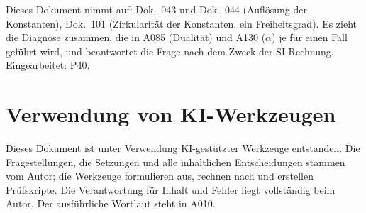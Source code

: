 Dieses Dokument nimmt auf: Dok.~043 und Dok.~044 (Auflösung der Konstanten),
Dok.~101 (Zirkularität der Konstanten, ein Freiheitsgrad). Es zieht die
Diagnose zusammen, die in A085 (Dualität) und A130 ($\alpha$) je für einen Fall
geführt wird, und beantwortet die Frage nach dem Zweck der SI-Rechnung.
Eingearbeitet: P40.

\section{Verwendung von KI-Werkzeugen}

Dieses Dokument ist unter Verwendung KI-gestützter Werkzeuge entstanden. Die
Fragestellungen, die Setzungen und alle inhaltlichen Entscheidungen stammen vom
Autor; die Werkzeuge formulieren aus, rechnen nach und erstellen Prüfskripte.
Die Verantwortung für Inhalt und Fehler liegt vollständig beim Autor. Der
ausführliche Wortlaut steht in A010.
